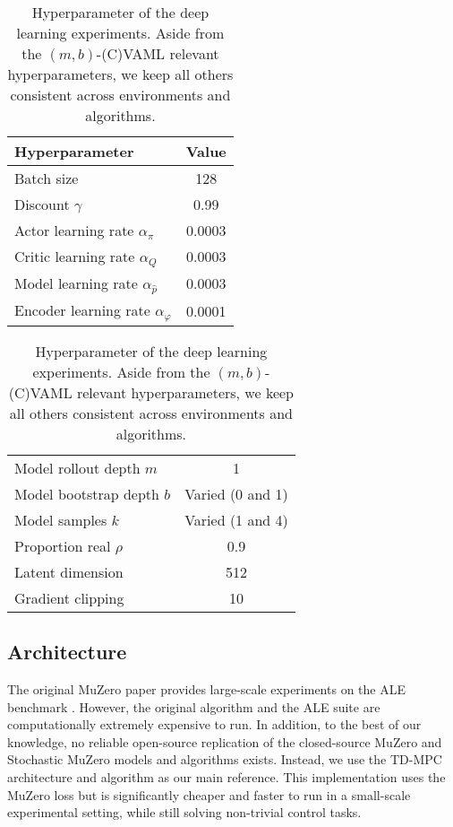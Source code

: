 \begin{table}[]
    \centering
    \begin{tabular}{l|c}
    Hyperparameter & Value \\\hline
    Batch size & 128\\
    Discount $\gamma$ & 0.99 \\
    Actor learning rate $\alpha_\pi$  & 0.0003 \\
    Critic learning rate $\alpha_Q$ & 0.0003 \\
    Model learning rate $\alpha_{\hat{p}}$  & 0.0003 \\
    Encoder learning rate $\alpha_\varphi$ & 0.0001 \\
    \end{tabular}
    \begin{tabular}{l|c}
     \\
    Model rollout depth $m$ & 1 \\
    Model bootstrap depth $b$ & Varied (0 and 1) \\
    Model samples $k$ & Varied (1 and 4) \\
    Proportion real $\rho$ & 0.9 \\
    Latent dimension & 512 \\
    Gradient clipping & 10 \\
    \end{tabular}
    \caption{Hyperparameter of the deep learning experiments. Aside from the $(m,b)$-(C)VAML relevant hyperparameters, we keep all others consistent across environments and algorithms.}
    \label{tab:hyperparams}
\end{table}

\subsection{Architecture}
The original MuZero paper \parencite{schrittwieser2020mastering} provides large-scale experiments on the ALE benchmark \parencite{bellemare13arcade}.
However, the original algorithm and the ALE suite are computationally extremely expensive to run.
In addition, to the best of our knowledge, no reliable open-source replication of the closed-source MuZero and Stochastic MuZero models and algorithms exists.
Instead, we use the TD-MPC architecture and algorithm \parencite{hansen2022temporal} as our main reference.
This implementation uses the MuZero loss but is significantly cheaper and faster to run in a small-scale experimental setting, while still solving non-trivial control tasks.

